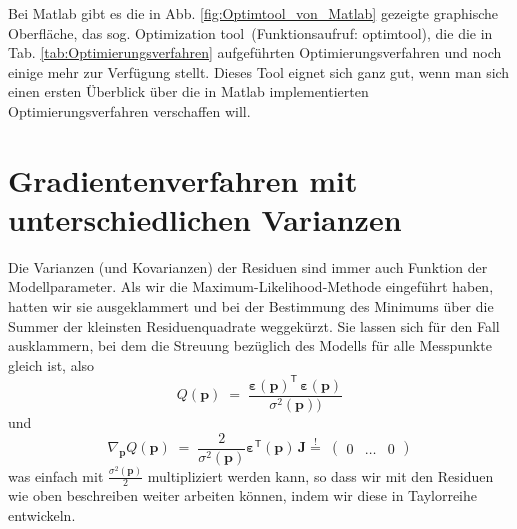 Bei Matlab gibt es die in Abb. \ref{fig:Optimtool_von_Matlab} gezeigte graphische Oberfläche, das sog.
\glq Optimization tool\grq~(Funktionsaufruf: \glq optimtool\grq),
die die in Tab. \ref*{tab:Optimierungsverfahren} aufgeführten
Optimierungsverfahren und noch einige mehr zur Verfügung stellt.
Dieses Tool eignet sich ganz gut, wenn man sich einen ersten Überblick
über die in Matlab implementierten Optimierungsverfahren verschaffen will. \\

\newpage
\section{Gradientenverfahren mit unterschiedlichen Varianzen}
\label{unterschiedVar}
Die Varianzen (und Kovarianzen) der Residuen sind immer auch Funktion der Modellparameter. Als wir die
Maximum-Likelihood-Methode eingeführt haben, hatten wir sie ausgeklammert und bei der Bestimmung
des Minimums über die Summer der kleinsten Residuenquadrate weggekürzt. Sie
lassen sich für den Fall ausklammern, bei dem die Streuung bezüglich des Modells
für alle Messpunkte gleich ist, also
\begin{equation}
Q(\mathbf{p}) \; = \;
 \frac{\boldsymbol{\varepsilon}(\mathbf{p})^\mathsf{T} \, \boldsymbol{\varepsilon}(\mathbf{p})}{\sigma^2(\mathbf{p}))}
\end{equation}
und
\begin{equation}
\nabla_{\mathbf{p}} Q(\mathbf{p})  \; = \;
\frac{2}{\sigma^2(\mathbf{p})} \boldsymbol{\varepsilon}^\textsf{T}(\mathbf{p})
 \, \boldsymbol{J} \overset{!}{=} \; \left(\begin{array}{ccc} 0 & \dots & 0 \end{array}\right)
\label{ZielfunktionalGradJmitSigma}
\end{equation}
was einfach mit $\frac{\sigma^2(\mathbf{p})}{2}$ multipliziert werden kann, so dass wir mit
den Residuen wie oben beschreiben weiter arbeiten können, indem wir diese in Taylorreihe entwickeln.

